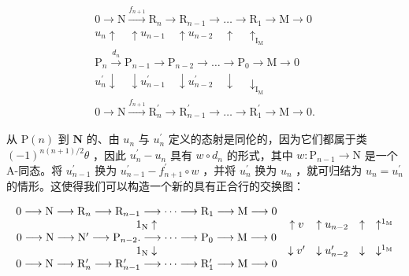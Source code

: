 \[
\begin{array}{c} 0 \longrightarrow \mathrm{N} \xrightarrow {f _ {n + 1}} \mathrm{R} _ {n} \longrightarrow \mathrm{R} _ {n - 1} \longrightarrow \dots \longrightarrow \mathrm{R} _ {1} \longrightarrow \mathrm{M} \longrightarrow 0 \\ u _ {n} \uparrow \quad \uparrow u _ {n - 1} \quad \uparrow u _ {n - 2} \quad \uparrow \quad \uparrow_ {\mathrm{I} _ {\mathrm{M}}} \\ \mathrm{P} _ {n} \xrightarrow {d _ {n}} \mathrm{P} _ {n - 1} \longrightarrow \mathrm{P} _ {n - 2} \longrightarrow \dots \longrightarrow \mathrm{P} _ {0} \longrightarrow \mathrm{M} \longrightarrow 0 \\ u _ {n} ^ {\prime} \downarrow \quad \downarrow u _ {n - 1} ^ {\prime} \quad \downarrow u _ {n - 2} ^ {\prime} \quad \downarrow \quad \downarrow_ {\mathrm{I} _ {\mathrm{M}}} \\ 0 \longrightarrow \mathrm{N} \xrightarrow {f _ {n + 1}} \mathrm{R} _ {n} ^ {\prime} \longrightarrow \mathrm{R} _ {n - 1} ^ {\prime} \longrightarrow \dots \longrightarrow \mathrm{R} _ {1} ^ {\prime} \longrightarrow \mathrm{M} \longrightarrow 0. \end{array}
\]

从 \(\mathrm{P}(n)\) 到 \(\mathbf{N}\) 的、由 \(u_{n}\) 与 \(u_{n}^{\prime}\) 定义的态射是同伦的，因为它们都属于类 \((-1)^{n(n + 1) / 2}\theta\) ，因此 \(u_{n}^{\prime} - u_{n}\) 具有 \(w\circ d_n\) 的形式，其中 \(w:\mathrm{P}_{n - 1}\to \mathrm{N}\) 是一个 A-同态。将 \(u_{n - 1}^{\prime}\) 换为 \(u_{n - 1}^{\prime} - f_{n + 1}^{\prime}\circ w\) ，并将 \(u_{n}^{\prime}\) 换为 \(u_{n}\) ，就可归结为 \(u_{n} = u_{n}^{\prime}\) 的情形。这使得我们可以构造一个新的具有正合行的交换图：

\[
\begin{array}{c c c c c c c} 0 \longrightarrow \mathrm{N} \longrightarrow \mathrm{R} _ {n} \longrightarrow \mathrm{R} _ {n - 1} \longrightarrow \dots \longrightarrow \mathrm{R} _ {1} \longrightarrow \mathrm{M} \longrightarrow 0 \\ 1 _ {\mathrm{N}} \uparrow & \uparrow v & \uparrow u _ {n - 2} & \uparrow & \uparrow^ {1 _ {\mathrm{M}}} \\ 0 \longrightarrow \mathrm{N} \longrightarrow \mathrm{N} ^ {\prime} \longrightarrow \mathrm{P} _ {n - 2}. \longrightarrow \dots \longrightarrow \mathrm{P} _ {0} \longrightarrow \mathrm{M} \longrightarrow 0 \\ 1 _ {\mathrm{N}} \downarrow & \downarrow v ^ {\prime} & \downarrow u _ {n - 2} ^ {\prime} & \downarrow & \downarrow^ {1 _ {\mathrm{M}}} \\ 0 \longrightarrow \mathrm{N} \longrightarrow \mathrm{R} _ {n} ^ {\prime} \longrightarrow \mathrm{R} _ {n - 1} ^ {\prime} \longrightarrow \dots \longrightarrow \mathrm{R} _ {1} ^ {\prime} \longrightarrow \mathrm{M} \longrightarrow 0 \end{array}
\]

